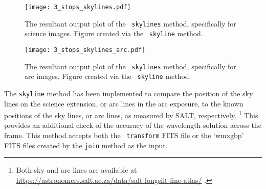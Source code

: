 \begin{figure}[t]
    \centering
    \texttt{[image: 3\_stops\_skylines.pdf]}
    \caption{The resultant output plot of the \stops\ \texttt{skylines} method, specifically for science images. Figure created via the \stops\ \texttt{skyline} method.}
    \label{fig:stops_sky_eg}
\end{figure}
\begin{figure}[t]
    \centering
    \texttt{[image: 3\_stops\_skylines\_arc.pdf]}
    \caption{The resultant output plot of the \stops\ \texttt{skylines} method, specifically for arc images. Figure created via the \stops\ \texttt{skyline} method.}
    \label{fig:stops_sky_arc_eg}
\end{figure}

The \texttt{skyline} method has been implemented to compare the position of the sky lines on the science extension, or arc lines in the arc exposure, to the known positions of the sky lines, or arc lines, as measured by \gls{SALT}, respectively.%
\footnote{Both sky and arc lines are available at \url{https://astronomers.salt.ac.za/data/salt-longslit-line-atlas/} .}
This provides an additional check of the accuracy of the wavelength solution across the frame. This method accepts both the \iraf\ \texttt{transform} \gls{FITS} file or the `wmxgbp' \gls{FITS} files created by the \texttt{join} method as the input.

